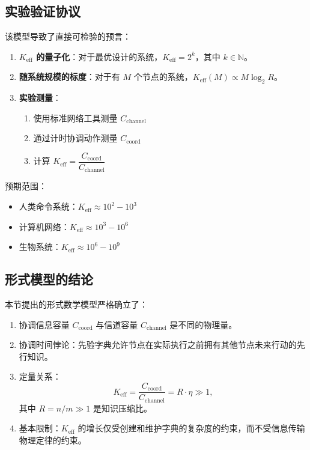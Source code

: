 \documentclass[11pt,a4paper]{article}
\begin{document}
	\subsection{实验验证协议}
	
	该模型导致了直接可检验的预言：
	
	\begin{enumerate}
		\item \textbf{$K_{\mathrm{eff}}$ 的量子化}：对于最优设计的系统，$K_{\mathrm{eff}} = 2^k$，其中 $k \in \mathbb{N}$。
		
		\item \textbf{随系统规模的标度}：对于有 $M$ 个节点的系统，$K_{\mathrm{eff}}(M) \propto M \log_2 R$。
		
		\item \textbf{实验测量}： 
		\begin{enumerate}
			\item 使用标准网络工具测量 $C_{\text{channel}}$
			\item 通过计时协调动作测量 $C_{\text{coord}}$
			\item 计算 $K_{\mathrm{eff}} = \dfrac{C_{\text{coord}}}{C_{\text{channel}}}$
		\end{enumerate}
	\end{enumerate}
	
	预期范围：
	\begin{itemize}
		\item 人类命令系统：$K_{\mathrm{eff}} \approx 10^2 - 10^3$
		\item 计算机网络：$K_{\mathrm{eff}} \approx 10^3 - 10^6$
		\item 生物系统：$K_{\mathrm{eff}} \approx 10^6 - 10^9$
	\end{itemize}
	
	\subsection{形式模型的结论}
	
	本节提出的形式数学模型严格确立了：
	
	\begin{enumerate}
		\item 协调信息容量 $C_{\text{coord}}$ 与信道容量 $C_{\text{channel}}$ 是不同的物理量。
		
		\item 协调时间悖论：先验字典允许节点在实际执行之前拥有其他节点未来行动的先行知识。
		
		\item 定量关系：
		\[
		K_{\mathrm{eff}} = \frac{C_{\text{coord}}}{C_{\text{channel}}} = R \cdot \eta \gg 1,
		\]
		其中 $R = n/m \gg 1$ 是知识压缩比。
		
		\item 基本限制：$K_{\mathrm{eff}}$ 的增长仅受创建和维护字典的复杂度的约束，而不受信息传输物理定律的约束。
	\end{enumerate}
	
\end{document}
